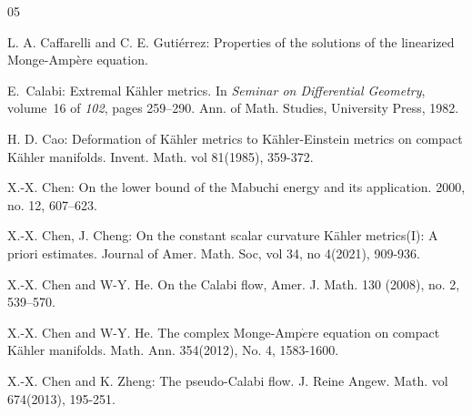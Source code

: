 \documentclass[11pt]{amsart}
\numberwithin{equation}{section}
\begin{document}
\begin{thebibliography}{05}







L.  A.  Caffarelli and C.  E.  Gutiérrez:
\newblock Properties of the solutions of the linearized Monge-Ampère equation.


E.~Calabi:
\newblock Extremal {K}\"ahler metrics.
\newblock In {\em Seminar on Differential Geometry}, volume~16 of {\em 102},
  pages 259--290. Ann. of Math. Studies, University Press, 1982.



H.  D.  Cao:
\newblock Deformation of K\"ahler metrics to K\"ahler-Einstein metrics on compact K\"ahler manifolds.
\newblock Invent.  Math.  vol 81(1985),  359-372.







X.-X. Chen:
\newblock On the lower bound of the {M}abuchi energy and its application.
 2000, no. 12, 607--623. 




X.-X. Chen, J. Cheng:
\newblock On the constant scalar curvature K\"ahler metrics(I): A priori estimates.
\newblock Journal of Amer.  Math.  Soc,  vol 34,  no 4(2021),  909-936.




X.-X. Chen and W-Y. He.
\newblock On the Calabi flow,
\newblock  Amer. J.  Math. 130 (2008), no. 2, 539--570.


X.-X. Chen and W-Y. He.
\newblock The complex Monge-Amp$\textrm{$\grave{e}$}$re equation on compact K\"ahler manifolds.
\newblock  Math. Ann. 354(2012), No. 4, 1583-1600.






















X.-X.  Chen and K.  Zheng:
\newblock The pseudo-Calabi flow.
\newblock J.  Reine Angew.  Math.  vol 674(2013),  195-251.








\end{thebibliography}
\end{document}
